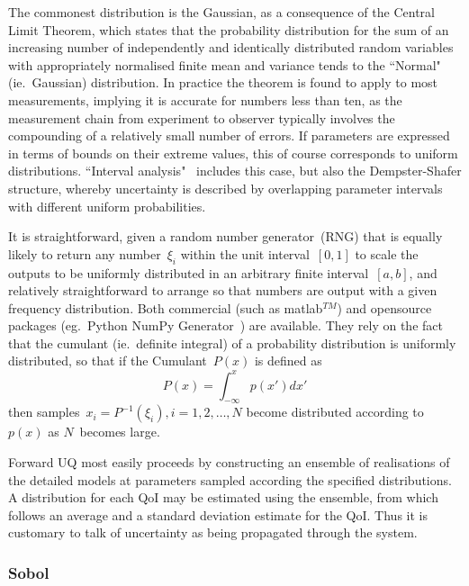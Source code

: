 The commonest distribution is the Gaussian, as a consequence of the Central
Limit Theorem, which states that the probability
distribution for the sum of an increasing number of independently and identically
distributed random variables with appropriately normalised finite mean and variance tends
to the ``Normal" (ie.\ Gaussian) distribution. In practice the theorem is found to apply
to most measurements, implying it is accurate for numbers less than ten,
as the measurement chain from
experiment to observer typically involves the compounding of a relatively small number of errors.
If parameters are expressed in terms of bounds on their extreme values,
this of course corresponds to uniform distributions. ``Interval analysis"~\cite{Pa15Unce}
includes this case, but also the Dempster-Shafer structure, whereby
uncertainty is described by overlapping parameter intervals with different
uniform probabilities.

It is straightforward, given a random number generator~(RNG) that is equally likely
to return any number~$\xi_i$ within the unit interval~$[0,1]$
to scale the outputs to be uniformly distributed
in an arbitrary finite interval~$[a,b]$, and relatively
straightforward to arrange so that numbers are output with a given frequency
distribution. Both commercial (such as matlab$^{TM}$) and opensource packages
(eg.\ Python NumPy Generator~\cite{numpyrandwebsite}) are available.
They rely on the fact that the
cumulant (ie.\ definite integral) of a probability distribution is uniformly
distributed, so that if the Cumulant~$P(x)$ is defined as
\begin{equation}\label{eq:cumul}
P(x)=\int_{-\infty}^x  p(x') dx'
\end{equation}
then samples~$x_i= P^{-1}(\xi_i), i=1,2,\ldots, N$ become distributed according to~$p(x)$
as $N$~becomes large.

Forward UQ most easily proceeds by constructing an ensemble of realisations of the 
detailed models at parameters sampled according the specified distributions.
A distribution for each QoI may be estimated using the ensemble, from which
follows an average and a standard deviation estimate for the QoI.
Thus it is customary to talk of uncertainty as being propagated through the system.


\subsubsection{Sobol}\label{sec:sobol}

